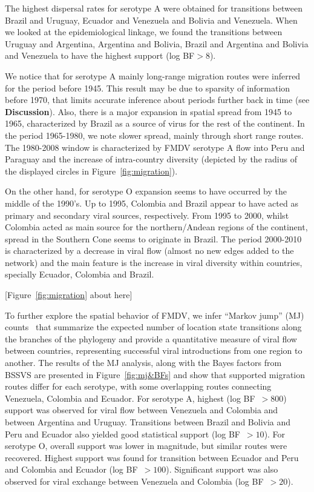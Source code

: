 \documentclass[10pt]{article}
\begin{document}
The highest dispersal rates for serotype A were obtained for transitions between Brazil and Uruguay, Ecuador and Venezuela and Bolivia and Venezuela.
When we looked at the epidemiological linkage, we found the transitions between Uruguay and Argentina, Argentina and Bolivia, Brazil and Argentina and Bolivia and Venezuela to have the highest support (log BF$>8$).

We notice that for serotype A mainly long-range migration routes were inferred for the period before 1945.
This result may be due to sparsity of information before 1970, that limits accurate inference about periods further back in time (see {\bf Discussion}). 
Also, there is a major expansion in spatial spread from 1945 to 1965, characterized by Brazil as a source of virus for the rest of the continent.
In the period 1965-1980, we note slower spread, mainly through short range routes.
The 1980-2008 window is characterized by FMDV serotype A flow into Peru and Paraguay and the increase of intra-country diversity (depicted by the radius of the displayed circles in Figure~\ref{fig:migration}).   

On the other hand, for serotype O expansion seems to have occurred by the middle of the 1990's.
Up to 1995, Colombia and Brazil appear to have acted as primary and secondary viral sources, respectively.
From 1995 to 2000, whilst Colombia acted as main source for the northern/Andean regions of the continent, spread in the Southern Cone seems to originate in Brazil.
The period 2000-2010 is characterized by a decrease in viral flow (almost no new edges added to the network) and the main feature is the increase in viral diversity within countries, specially Ecuador, Colombia and Brazil.

\begin{center}
 [Figure~\ref{fig:migration} about here]
\end{center}

To further explore the spatial behavior of FMDV, we infer
``Markov jump'' (MJ) counts~\cite{Minin2008} that summarize the expected number of location state transitions along the  branches of the phylogeny and provide a quantitative measure of viral flow between countries, representing successful viral introductions from one region to another.
The results of the MJ analysis, along with the Bayes factors from BSSVS are presented in Figure~\ref{fig:mj&BFs} and show that supported migration routes differ for each serotype, with some overlapping routes connecting Venezuela, Colombia and Ecuador.
For serotype A, highest (log BF~$>800$) support was observed for viral flow between Venezuela and Colombia and between Argentina and Uruguay.
Transitions between Brazil and Bolivia and Peru and Ecuador also yielded good statistical support (log BF~$>10$).
For serotype O, overall support was lower in magnitude, but similar routes were recovered.
Highest support was found for transition between Ecuador and Peru and Colombia and Ecuador (log BF~$>100$). Significant support was also observed for viral exchange between Venezuela and Colombia (log BF~$>20$). 
\end{document}
